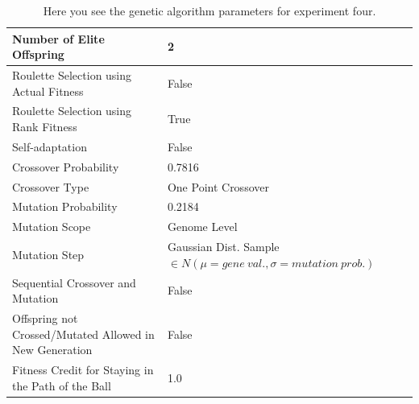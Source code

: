 \documentclass[a4paper,10pt]{article}
\begin{document}
\begin{table}[H]
\footnotesize
\begin{tabular}{ >{\columncolor[gray]{0.8}} l | l }
\hline
Number of Elite Offspring                                            & 2                                                                            \\ \hline
Roulette Selection using Actual Fitness                              & False                                                                        \\ \hline
Roulette Selection using Rank Fitness                                & True                                                                         \\ \hline
Self-adaptation                                                      & False                                                                        \\ \hline
Crossover Probability                                                & 0.7816                                                                       \\ \hline
Crossover Type                                                       & One Point Crossover                                                          \\ \hline
Mutation Probability                                                 & 0.2184                                                                       \\ \hline
Mutation Scope                                                       & Genome Level                                                                 \\ \hline
Mutation Step                                                        & Gaussian Dist. Sample $\in N(\mu=gene \ val., \sigma = mutation \ prob.)$    \\ \hline
Sequential Crossover and Mutation                                    & False                                                      	            \\ \hline
Offspring not Crossed/Mutated Allowed in New Generation              & False                                                     	            \\ \hline
Fitness Credit for Staying in the Path of the Ball                   & 1.0                                                      	            \\ \hline
\end{tabular}
\caption{Here you see the genetic algorithm parameters for experiment four.}
\label{tab:exp4}
\end{table}
\end{document}
